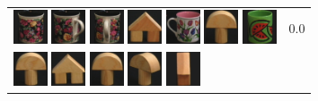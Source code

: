 \begin{figure}[tbp]
\begin{center}
\begin{tabular}{m{11cm} | m{3cm} |}
\includegraphics[width=1cm]{coil/beeld-62.eps}
\includegraphics[width=1cm]{coil/beeld-64.eps}
\includegraphics[width=1cm]{coil/beeld-65.eps}
\includegraphics[width=1cm]{coil/beeld-43.eps}
\includegraphics[width=1cm]{coil/beeld-7.eps}
\includegraphics[width=1cm]{coil/beeld-1.eps}
\includegraphics[width=1cm]{coil/beeld-32.eps}
& {\scriptsize 0.0}
\\
\includegraphics[width=1cm]{coil/beeld-0.eps}
\includegraphics[width=1cm]{coil/beeld-42.eps}
\includegraphics[width=1cm]{coil/beeld-1.eps}
\includegraphics[width=1cm]{coil/beeld-4.eps}
\includegraphics[width=1cm]{coil/beeld-44.eps}

\end{tabular}
\end{center}
\end{figure}
